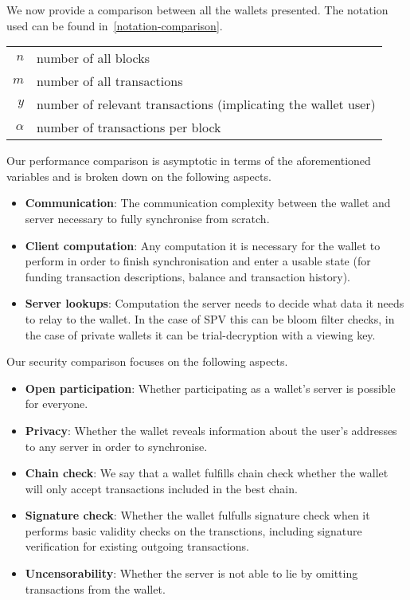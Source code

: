 We now provide a comparison between all the wallets presented. The notation used can be found in~\cref{notation-comparison}.

\begin{table*}
    \caption{The notation used throughout our comparison.\label{notation-comparison}}
    \centering
    \begin{tabular}{r|l}
    $n$ & number of all blocks \\
    $m$ & number of all transactions \\
    $y$ & number of relevant transactions (implicating the wallet user) \\
    $\alpha$ & number of transactions per block \\
    \end{tabular}
\end{table*}

Our performance comparison is asymptotic in terms of the aforementioned variables and is broken down on the following aspects.

\begin{itemize}
    \item \textbf{Communication}: The communication complexity between the wallet and server necessary to fully synchronise from scratch.
    \item \textbf{Client computation}: Any computation it is necessary for the wallet to perform in order to finish synchronisation and enter a usable state (for funding transaction descriptions, balance and transaction history).
    \item \textbf{Server lookups}: Computation the server needs to decide what data it needs to relay to the wallet. In the case of SPV this can be bloom filter checks, in the case of private wallets it can be trial-decryption with a viewing key.
\end{itemize}

Our security comparison focuses on the following aspects.
\begin{itemize}
    \item \textbf{Open participation}: Whether participating as a wallet's server is possible for everyone.
    \item \textbf{Privacy}: Whether the wallet reveals information about the user's addresses to any server in order to synchronise.
    \item \textbf{Chain check}: We say that a wallet fulfills chain check whether the wallet will only accept transactions included in the best chain.
    \item \textbf{Signature check}: Whether the wallet fulfulls signature check when it performs basic validity checks on the transctions, including signature verification for existing outgoing transactions.
    \item \textbf{Uncensorability}: Whether the server is not able to lie by omitting transactions from the wallet.
\end{itemize}

